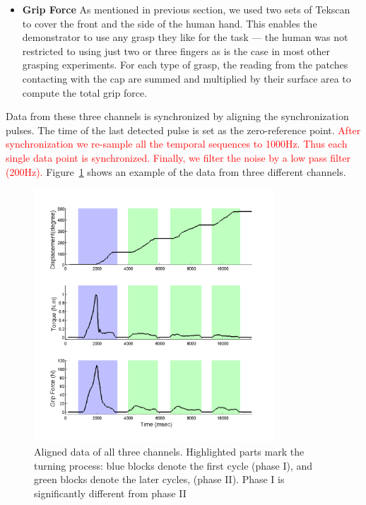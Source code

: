 \begin{itemize}
\item{\textbf{Grip Force}}
\label{tekscan}
As mentioned in previous section, we used two sets of Tekscan to cover
the front and the side of the human hand. This enables the
demonstrator to use any grasp they like for the task --- the human was
not restricted to using just two or three fingers as is the case in
most other grasping experiments. For each type of grasp, the reading
from the patches contacting with the cap are summed and multiplied by
their surface area to compute the total grip force. %
\end{itemize}

Data from these three channels is synchronized by aligning the
synchronization pulses. The time of the last detected pulse is set as
the zero-reference point. \textcolor{red}{After synchronization we re-sample all the
temporal sequences to 1000Hz. Thus each single data point is
synchronized. Finally, we filter the noise by a low pass
filter (200Hz).} Figure~\ref{fig:3channels} shows an example of the data from
three different channels.



\begin{figure}
  \centering
  \hspace{-0.5cm}
  \includegraphics[width=9cm]{./fig/b3c2_1_sTF.pdf}
  \vspace{-0.5cm}
  \caption{ \scriptsize{Aligned data of all three
      channels. Highlighted parts mark the turning process: blue
      blocks denote the first cycle (phase I), and green
      blocks denote the later cycles, (phase II). Phase I is
      significantly different from phase II}
}
\label{fig:3channels}
\end{figure}

